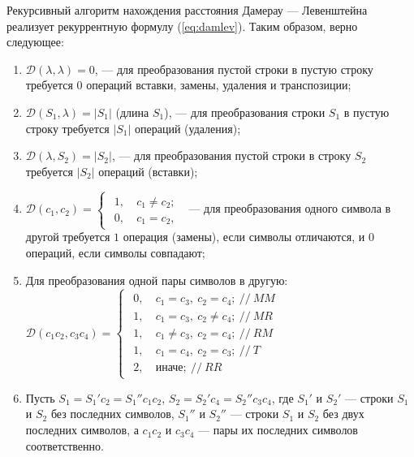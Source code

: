 Рекурсивный алгоритм нахождения расстояния Дамерау --- Левенштейна реализует рекуррентную формулу (\ref{eq:damlev}). Таким образом, верно следующее:
\begin{enumerate}
    \item $\mathcal{D}(\lambda, \lambda) = 0$, --- для преобразования пустой строки в пустую строку требуется $0$ операций вставки, замены, удаления и транспозиции;
    \item $\mathcal{D}(S_1, \lambda) = |S_1|$ (длина $S_1$), --- для преобразования строки $S_1$ в пустую строку требуется $|S_1|$ операций (удаления);
    \item $\mathcal{D}(\lambda, S_2) = |S_2|$, --- для преобразования пустой строки в строку $S_2$ требуется $|S_2|$ операций (вставки);
    \item $\mathcal{D}(c_1, c_2) = \begin{cases}
            \begin{aligned}
                1,\ &c_1 \neq c_2; \\
                0,\ &c_1 = c_2,
            \end{aligned}
    \end{cases} $ --- для преобразования одного символа в другой требуется $1$ операция (замены), если символы отличаются, и $0$ операций, если символы совпадают;
    \item Для преобразования одной пары символов в другую: \\
        $\mathcal{D}(c_1c_2, c_3c_4) = \begin{cases}
            \begin{aligned}
                0,\ &c_1 = c_3,\ c_2 = c_4;\ //\ MM \\
                1,\ &c_1 = c_3,\ c_2 \neq c_4;\ //\ MR \\
                1,\ &c_1 \neq c_3,\ c_2 = c_4;\ //\ RM \\
                1,\ &c_1 = c_4,\ c_2 = c_3;\ //\ T \\
                2,\ &\text{иначе};\ //\ RR
            \end{aligned}
        \end{cases} $
    \item Пусть $S_1 = S_1'c_2 = S_1''c_1c_2$, $S_2 = S_2'c_4 = S_2''c_3c_4$, где $S_1'$ и $S_2'$ --- строки $S_1$ и $S_2$ без последних символов, $S_1''$ и $S_2''$ --- строки $S_1$ и $S_2$ без двух последних символов, а $c_1c_2$ и $c_3c_4$ --- пары их последних символов соответственно. $$
$$
\end{enumerate}
